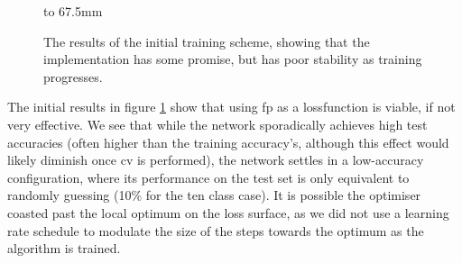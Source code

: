 \begin{figure}[p]
    \hbox to 67.5mm{}%
    \caption[The results of the initial training scheme.]{The results of the initial training scheme, showing that the implementation has some promise, but has poor stability as training progresses.}
    \label{fig:training_scheme_1}
\end{figure}

The initial results in figure \ref{fig:training_scheme_1} show that using \gls{fp} as a \gls{lossfunction} is viable, if not very effective. We see that while the network sporadically achieves high test accuracies (often higher than the training accuracy's, although this effect would likely diminish once \gls{cv} is performed), the network settles in a low-accuracy configuration, where its performance on the test set is only equivalent to randomly guessing (10\% for the ten class case). It is possible the optimiser coasted past the local optimum on the loss surface, as we did not use a learning rate schedule to modulate the size of the steps towards the optimum as the algorithm is trained.
\bigskip

